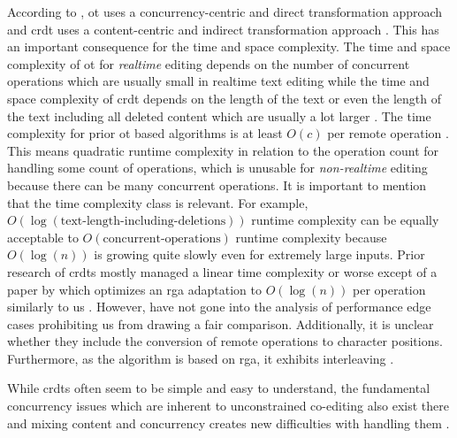 According to , \gls{ot} uses a concurrency-centric and direct transformation approach and \gls{crdt} uses a content-centric and indirect transformation approach \cite[Section 1]{2019-sun-difference-ot-crdt-1-general-transformation-framework}. This has an important consequence for the time and space complexity. The time and space complexity of \gls{ot} for \textit{realtime} editing depends on the number of concurrent operations which are usually small in realtime text editing while the time and space complexity of \gls{crdt} depends on the length of the text or even the length of the text including all deleted content which are usually a lot larger \cite[Section 5.3]{2019-sun-difference-ot-crdt-1-general-transformation-framework}. The time complexity for prior \gls{ot} based algorithms is at least $O(c)$ per remote operation \cite[Section 3.1.4]{2019-sun-difference-ot-crdt-2-correctness-complexity}. This means quadratic runtime complexity in relation to the operation count for handling some count of operations, which is unusable for \textit{non-realtime} editing because there can be many concurrent operations. It is important to mention that the time complexity class is relevant. For example, $O(\log(\text{text-length-including-deletions}))$ runtime complexity can be equally acceptable to $O(\text{concurrent-operations})$ runtime complexity because $O(\log(n))$ is growing quite slowly even for extremely large inputs. Prior research of \glspl{crdt} mostly managed a linear time complexity or worse except of a paper by  which optimizes an \gls{rga} adaptation to $O(\log(n))$ per operation similarly to us \cite[Table 4]{2019-sun-difference-ot-crdt-2-correctness-complexity}. However,  have not gone into the analysis of performance edge cases prohibiting us from drawing a fair comparison. Additionally, it is unclear whether they include the conversion of remote operations to character positions. Furthermore, as the algorithm is based on \gls{rga}, it exhibits interleaving \cite[Table 1]{2023-weidner-minimizing-interleaving}.

While \glspl{crdt} often seem to be simple and easy to understand, the fundamental concurrency issues which are inherent to unconstrained co-editing also exist there and mixing content and concurrency creates new difficulties with handling them \cite[Section~4]{2019-sun-difference-ot-crdt-2-correctness-complexity}.
